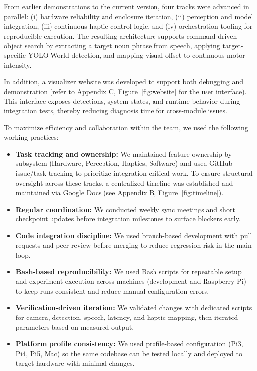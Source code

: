 \documentclass{article}
\begin{document}
From earlier demonstrations to the current version, four tracks were advanced in parallel: (i) hardware reliability and enclosure iteration, (ii) perception and model integration, (iii) continuous haptic control logic, and (iv) orchestration tooling for reproducible execution. The resulting architecture supports command-driven object search by extracting a target noun phrase from speech, applying target-specific YOLO-World detection, and mapping visual offset to continuous motor intensity.

In addition, a visualizer website was developed to support both debugging and demonstration (refer to Appendix C, Figure~\ref{fig:website} for the user interface). This interface exposes detections, system states, and runtime behavior during integration tests, thereby reducing diagnosis time for cross-module issues.

To maximize efficiency and collaboration within the team, we used the following working practices:
\begin{itemize}
    \item \textbf{Task tracking and ownership:} We maintained feature ownership by subsystem (Hardware, Perception, Haptics, Software) and used GitHub~\cite{github} issue/task tracking to prioritize integration-critical work. To ensure structural oversight across these tracks, a centralized timeline was established and maintained via Google Docs (see Appendix B, Figure~\ref{fig:timeline}).
    \item \textbf{Regular coordination:} We conducted weekly sync meetings and short checkpoint updates before integration milestones to surface blockers early.
    \item \textbf{Code integration discipline:} We used branch-based development with pull requests and peer review before merging to reduce regression risk in the main loop.
    \item \textbf{Bash-based reproducibility:} We used Bash scripts for repeatable setup and experiment execution across machines (development and Raspberry Pi) to keep runs consistent and reduce manual configuration errors.
    \item \textbf{Verification-driven iteration:} We validated changes with dedicated scripts for camera, detection, speech, latency, and haptic mapping, then iterated parameters based on measured output.
    \item \textbf{Platform profile consistency:} We used profile-based configuration (Pi3, Pi4, Pi5, Mac) so the same codebase can be tested locally and deployed to target hardware with minimal changes.
\end{itemize}
\end{document}
